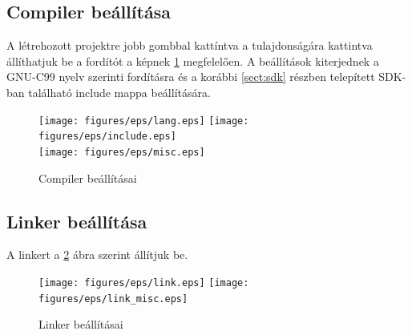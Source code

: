 \subsection{Compiler beállítása}
	A létrehozott projektre jobb gombbal kattíntva a tulajdonságára kattintva
	állíthatjuk be a fordítót a képnek \ref{fig:compiler} megfelelően.
	A beállítások kiterjednek a GNU-C99 nyelv szerinti fordításra és a korábbi
	\ref{sect:sdk} részben telepített SDK-ban található include mappa beállítására. 
	\begin{figure}[H]
	\centering
	\texttt{[image: figures/eps/lang.eps]}\hspace{1cm}
	\texttt{[image: figures/eps/include.eps]}\\\vspace{5mm}
	\texttt{[image: figures/eps/misc.eps]}
	\caption{Compiler beállításai} 
	\label{fig:compiler}
	\end{figure}

\subsection{Linker beállítása}
	A linkert a \ref{fig:linker} ábra szerint állítjuk be.
	\begin{figure}[H]
	\centering
	\texttt{[image: figures/eps/link.eps]}\hspace{1cm}
	\texttt{[image: figures/eps/link\_misc.eps]}\\\vspace{5mm}
	\caption{Linker beállításai} 
	\label{fig:linker}
	\end{figure}

